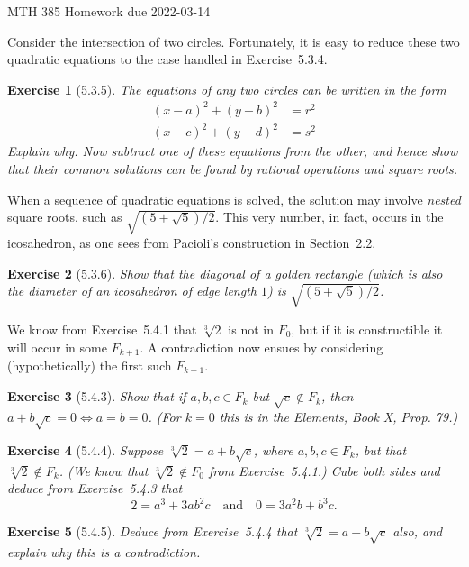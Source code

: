 \documentclass[12pt]{article}
\theoremstyle{plain}
\newtheorem{ex}{Exercise}
\begin{document}
MTH 385 \qquad Homework due 2022-03-14

Consider the intersection of two circles. Fortunately, it is easy to reduce these two quadratic equations to the case handled in Exercise~5.3.4.

\begin{ex} [5.3.5]
  The equations of any two circles can be written in the form
  \begin{align*}
    (x-a)^2+(y-b)^2 &= r^2 \\
    (x-c)^2+(y-d)^2 &= s^2
  \end{align*}
  Explain why. Now subtract one of these equations from the other, and hence show that their common solutions can be found by rational operations and square roots.
\end{ex}

When a sequence of quadratic equations is solved, the solution may involve \emph{nested} square roots, such as $\sqrt{(5+\sqrt{5})/2}$. This very number, in fact, occurs in the icosahedron, as one sees from Pacioli's construction in Section~2.2.

\begin{ex} [5.3.6]
  Show that the diagonal of a golden rectangle (which is also the diameter of an icosahedron of edge length $1$) is $\sqrt{(5+\sqrt{5})/2}$.
\end{ex}

We know from Exercise~5.4.1 that $\sqrt[3]{2}$ is not in $F_0$, but if it is constructible it will occur in some $F_{k+1}$. A contradiction now ensues by considering (hypothetically) the first such $F_{k+1}$.

\begin{ex} [5.4.3]
  Show that if $a,b,c\in F_k$ but $\sqrt{c}\notin F_k$, then $a+b\sqrt{c}=0\Leftrightarrow a=b=0$. (For $k=0$ this is in the \emph{Elements}, Book X, Prop. 79.)
\end{ex}

\begin{ex} [5.4.4]
  Suppose $\sqrt[3]{2}=a+b\sqrt{c}$, where $a,b,c\in F_k$, but that $\sqrt[3]{2}\notin F_k$. (We know that $\sqrt[3]{2}\notin F_0$ from Exercise~5.4.1.) Cube both sides and deduce from Exercise~5.4.3 that
  \[
    2=a^3+3ab^2c\quad\text{and}\quad0=3a^2b+b^3c.
  \]
\end{ex}

\begin{ex} [5.4.5]
  Deduce from Exercise~5.4.4 that $\sqrt[3]{2}=a-b\sqrt{c}$ also, and explain why this is a contradiction.
\end{ex}
\end{document}
